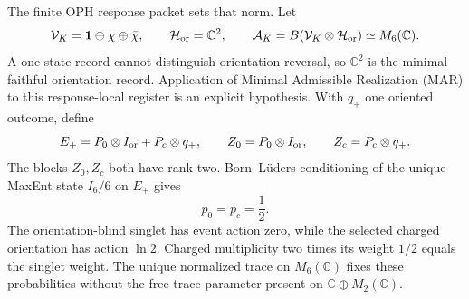 \documentclass[11pt]{article}
\begin{document}
The finite OPH response packet sets that norm. Let
\[
\mathcal V_K=\mathbf1\oplus\chi\oplus\bar\chi,
\qquad \mathcal H_{\rm or}=\mathbb C^2,
\qquad
\mathcal A_K=B(\mathcal V_K\otimes\mathcal H_{\rm or})\simeq M_6(\mathbb C).
\]
A one-state record cannot distinguish orientation reversal, so \(\mathbb C^2\) is the minimal
faithful orientation record. Application of Minimal Admissible Realization (MAR) to this
response-local register is an explicit hypothesis. With \(q_+\) one oriented outcome, define
\[
E_+=P_0\otimes I_{\rm or}+P_c\otimes q_+,
\qquad
Z_0=P_0\otimes I_{\rm or},
\qquad
Z_c=P_c\otimes q_+.
\]
The blocks \(Z_0,Z_c\) both have rank two. Born--L\"uders conditioning of the unique MaxEnt
state \(I_6/6\) on \(E_+\) gives
\[
p_0=p_c=\frac12.
\]
The orientation-blind singlet has event action zero, while the selected charged orientation has
action \(\ln2\). Charged multiplicity two times its weight \(1/2\) equals the singlet weight.
The unique normalized trace on \(M_6(\mathbb C)\) fixes these probabilities without the free trace
parameter present on \(\mathbb C\oplus M_2(\mathbb C)\).
\end{document}
